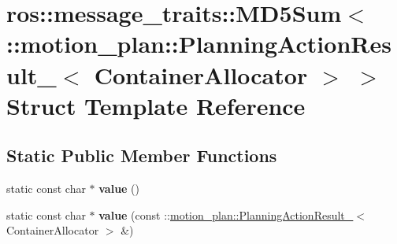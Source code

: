 \hypertarget{structros_1_1message__traits_1_1MD5Sum_3_01_1_1motion__plan_1_1PlanningActionResult___3_01ContainerAllocator_01_4_01_4}{}\section{ros\+:\+:message\+\_\+traits\+:\+:M\+D5\+Sum$<$ \+:\+:motion\+\_\+plan\+:\+:Planning\+Action\+Result\+\_\+$<$ Container\+Allocator $>$ $>$ Struct Template Reference}
\label{structros_1_1message__traits_1_1MD5Sum_3_01_1_1motion__plan_1_1PlanningActionResult___3_01ContainerAllocator_01_4_01_4}
\subsection*{Static Public Member Functions}
\begin{DoxyCompactItemize}
\item 
\mbox{\label{structros_1_1message__traits_1_1MD5Sum_3_01_1_1motion__plan_1_1PlanningActionResult___3_01ContainerAllocator_01_4_01_4_a68144bd42cd836d535cfc88a32679009}} 
static const char $\ast$ {\bfseries value} ()
\item 
\mbox{\label{structros_1_1message__traits_1_1MD5Sum_3_01_1_1motion__plan_1_1PlanningActionResult___3_01ContainerAllocator_01_4_01_4_a77a6169e61575ade7fed35f6048a6751}} 
static const char $\ast$ {\bfseries value} (const \+::\hyperlink{structmotion__plan_1_1PlanningActionResult__}{motion\+\_\+plan\+::\+Planning\+Action\+Result\+\_\+}$<$ Container\+Allocator $>$ \&)
\end{DoxyCompactItemize}

